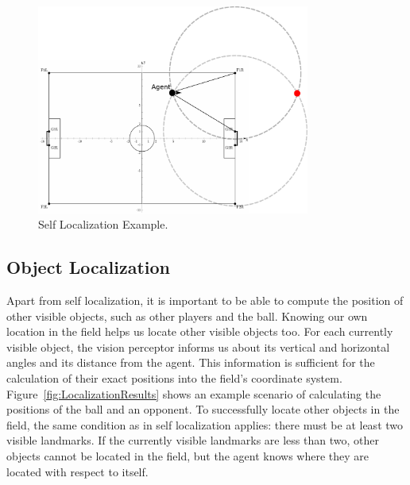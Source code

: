 \begin{figure}[t!]
\centering
  \includegraphics[width=0.8\textwidth]{Chapter3/figures/Localization.pdf}
  \caption{Self Localization Example.} 
  \label{fig:Localization}
\end{figure}

\subsection{Object Localization} 

Apart from self localization, it is important to be able to compute the position of other visible objects, such as other players and the ball. 
Knowing our own location in the field helps us locate other visible objects too. For each currently visible object, the vision perceptor informs us about its vertical and horizontal angles and its distance from the agent. This information is sufficient for the calculation of their exact positions into the field's coordinate system. Figure~\ref{fig:LocalizationResults} shows an example scenario of calculating the positions of the ball and an opponent. To successfully locate other objects in the field, the same condition as in self localization applies: there must be at least two visible landmarks. If the currently visible landmarks are less than two, other objects cannot be located in the field, but the agent knows where they are located with respect to itself. 



